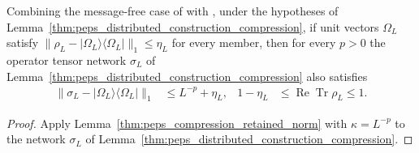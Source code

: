 \begin{lemma}
    \label{thm:peps_compression_retained_norm_network}
    \leanok
    Combining the message-free case of \cite[Theorem~5.2]{OpenAI2026PolynomialPEPS}
    with \cite[Remark~5.3]{OpenAI2026PolynomialPEPS}, under the hypotheses of
    Lemma~\ref{thm:peps_distributed_construction_compression}, if unit vectors
    $\Omega_L$ satisfy $\|\rho_L-|\Omega_L\rangle\langle\Omega_L|\|_1\le\eta_L$
    for every member, then for every $p>0$ the operator tensor network
    $\sigma_L$ of Lemma~\ref{thm:peps_distributed_construction_compression}
    also satisfies
    \begin{align}
        \|\sigma_L-|\Omega_L\rangle\langle\Omega_L|\|_1 & \le L^{-p}+\eta_L,                               &
        1-\eta_L                                        & \le\operatorname{Re}\operatorname{Tr}\rho_L\le1.
        \label{eq:peps_compression_retained_norm_network}
    \end{align}
\end{lemma}
\begin{proof}
    \leanok
    Apply Lemma~\ref{thm:peps_compression_retained_norm} with $\kappa=L^{-p}$
    to the network $\sigma_L$ of
    Lemma~\ref{thm:peps_distributed_construction_compression}.
\end{proof}
